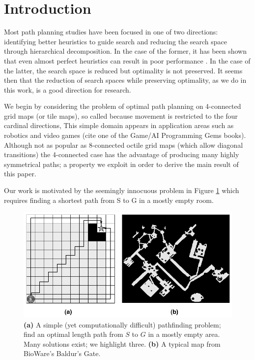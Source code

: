 \section{Introduction}
Most path planning studies have been focused in one of two directions: identifying better heuristics to 
guide search and reducing the search space through hierarchical decomposition.
In the case of the former, it has been shown that even almost perfect heuristics can result in poor 
performance \cite{malte08,korf98}. 
In the case of the latter, the search space is reduced but optimality is not preserved. 
It seems then that the reduction of search spaces while preserving optimality, as we do in this work, is a good direction for research.
\par
We begin by considering the problem of optimal path planning on 4-connected grid maps (or tile maps),
so called because movement is restricted to the four cardinal directions, 
This simple domain appears in application areas such as robotics \cite{latombe91} and video games 
(cite one of the Game/AI Programming Gems books).
Although not as popular as 8-connected octile grid maps (which allow diagonal transitions) the 4-connected case has 
the advantage of producing many highly symmetrical paths; 
a property we exploit in order to derive the main result of this paper.
\par 
Our work is motivated by the seemingly innocuous problem in Figure \ref{fig-emptymap} 
which requires finding a shortest path from S to G in a mostly empty room.
\begin{figure}[htbp]
	\vspace{-4pt}
       \begin{center}
                       \includegraphics[scale=0.30, trim = 20mm 20mm 20mm 0mm]{diagrams/emptymap.png}
       \end{center}
	\vspace{-3pt}
       \caption{\textbf{(a)} A simple (yet computationally difficult) pathfinding problem; find an 
optimal length path from $S$ to $G$ in a mostly empty area. 
Many solutions exist; we highlight three. 
\textbf{(b)} A typical map from BioWare's Baldur's Gate.}
       \label{fig-emptymap}
	\vspace{-12pt}
\end{figure}
